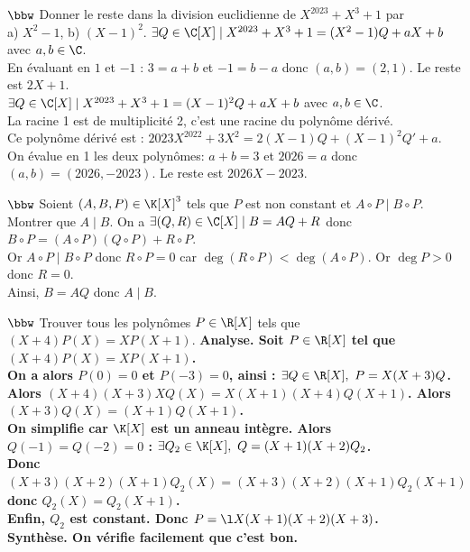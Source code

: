 \documentclass[11pt]{article}
\begin{document}
\begin{exercice}{$\bbw$}{}
    Donner le reste dans la division euclidienne de $X^{2023}+X^3+1$ par\\
    a) $X^2-1$, \quad b) $(X-1)^2$.
    \tcblower
     $\exists Q\in\C[X] \mid X^{2023}+X^3+1=(X^2-1)Q+aX+b$ avec $a,b\in\C$.\\
    En évaluant en $1$ et $-1$ : $3 = a+b$ et $-1=b-a$ donc $(a,b)=(2,1)$. Le reste est $2X+1$.\\
     $\exists Q \in \C[X] \mid X^{2023}+X^3+1=(X-1)^2Q+aX+b$ avec $a,b\in\C$.\\
    La racine 1 est de multiplicité 2, c'est une racine du polynôme dérivé.\\
    Ce polynôme dérivé est : $2023X^{2022}+3X^2=2(X-1)Q+(X-1)^2Q'+a$.\\
    On évalue en 1 les deux polynômes: $a+b=3$ et $2026=a$ donc $(a,b)=(2026,-2023)$. Le reste est $2026X-2023$.
\end{exercice}

\begin{exercice}{$\bbw$}{}
    Soient $(A,B,P)\in\K[X]^3$ tels que $P$ est non constant et $A\circ P \mid B\circ P$. Montrer que $A\mid B$.
    \tcblower
    On a $\exists (Q,R) \in \C[X] \mid B = AQ+R$ donc $B\circ P = (A\circ P)(Q\circ P)+R\circ P$.\\
    Or $A\circ P\mid B\circ P$ donc $R\circ P=0$ car $\deg(R\circ P)<\deg(A\circ P)$. Or $\deg P > 0$ donc $R=0$.\\
    Ainsi, $B=AQ$ donc $A\mid B$. 
\end{exercice}

\begin{exercice}{$\bbw$}{}
    Trouver tous les polynômes $P\in\R[X]$ tels que $(X+4)P(X)=XP(X+1)$.
    \tcblower
    \bf{Analyse.} Soit $P\in\R[X]$ tel que $(X+4)P(X)=XP(X+1)$.\\
    On a alors $P(0)=0$ et $P(-3)=0$, ainsi : $\exists Q \in \R[X], ~ P=X(X+3)Q$.\\
    Alors $(X+4)(X+3)XQ(X)=X(X+1)(X+4)Q(X+1)$. Alors $(X+3)Q(X)=(X+1)Q(X+1)$.\\
    On simplifie car $\K[X]$ est un anneau intègre. Alors $Q(-1)=Q(-2)=0$ : $\exists Q_2\in\K[X], ~ Q=(X+1)(X+2)Q_2$.\\
    Donc $(X+3)(X+2)(X+1)Q_2(X)=(X+3)(X+2)(X+1)Q_2(X+1)$ donc $Q_2(X)=Q_2(X+1)$.\\
    Enfin, $Q_2$ est constant. Donc $P=\l X(X+1)(X+2)(X+3)$.\\
    \bf{Synthèse.} On vérifie facilement que c'est bon.
\end{exercice}
\end{document}
